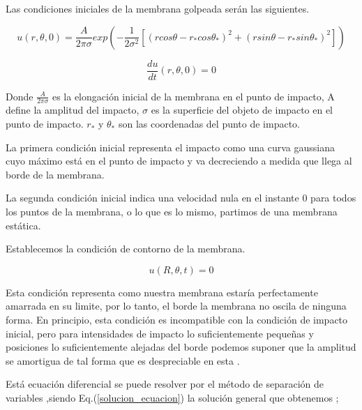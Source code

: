 \documentclass[journal, a4paper,onecolumn]{IEEEtran}
\newcommand{\equationref}[1]{Eq.(\ref{#1})}
\begin{document}
Las condiciones iniciales de la membrana golpeada serán las siguientes.\newline

\begin{equation}
  u(r,\theta,0)=\frac{A}{2\pi\sigma}exp\left( -\frac{1}{2\sigma ^2} [(rcos\theta-r_*cos\theta _*)^2+(rsin\theta-r_*sin\theta_*)^2]\right)  
\end{equation}\newline

\begin{equation}
    \frac{du}{dt}(r,\theta,0)=0
\end{equation}\newline 

Donde $\frac{A}{2\pi \sigma}$ es la elongación inicial de la membrana en el punto de impacto, A define la amplitud del impacto, $\sigma$ es la superficie del objeto de impacto en el punto de impacto. $r_*$ y $\theta _*$ son las coordenadas del punto de impacto. \newline

La primera condición inicial representa el impacto como una curva gaussiana cuyo máximo está en el punto de impacto y va decreciendo a medida que llega al borde de la membrana. \newline

La segunda condición inicial indica una velocidad nula en el instante 0 para todos los puntos de la membrana, o lo que es lo mismo, partimos de una membrana estática.\newline 

Establecemos la condición de contorno de la membrana.\newline

\begin{equation}
    u(R,\theta,t)=0
\end{equation}\newline 

 Esta condición representa como nuestra membrana estaría perfectamente amarrada en su limite, por lo tanto, el borde la membrana no oscila de ninguna forma. En principio, esta condición es incompatible con la condición de impacto inicial, pero para intensidades de impacto lo suficientemente pequeñas y posiciones lo suficientemente alejadas del borde podemos suponer que la amplitud se amortigua de tal forma que es despreciable en esta .\newline

Está ecuación diferencial se puede resolver por el método de separación de variables \cite{ecuacionesdif}
,siendo \equationref{solucion_ecuacion}  la solución general que obtenemos \cite{soundsimulation};\newline 
\end{document}
